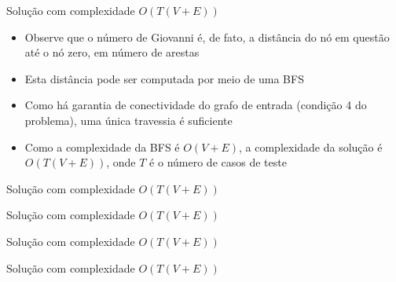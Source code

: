 \begin{frame}[fragile]{Solução com complexidade $O(T(V + E))$}

    \begin{itemize}
        \item Observe que o número de Giovanni é, de fato, a distância do nó em questão até o
         nó zero, em número de arestas

        \item Esta distância pode ser computada por meio de uma BFS

        \item Como há garantia de conectividade do grafo de entrada (condição 4 do problema),
            uma única travessia é suficiente
        
        \item Como a complexidade da BFS é $O(V + E)$, a complexidade da solução é 
            $O(T(V + E))$, onde $T$ é o número de casos de teste
   \end{itemize}

\end{frame}

\begin{frame}[fragile]{Solução com complexidade $O(T(V + E))$}
\end{frame}

\begin{frame}[fragile]{Solução com complexidade $O(T(V + E))$}
\end{frame}

\begin{frame}[fragile]{Solução com complexidade $O(T(V + E))$}
\end{frame}

\begin{frame}[fragile]{Solução com complexidade $O(T(V + E))$}
\end{frame}


